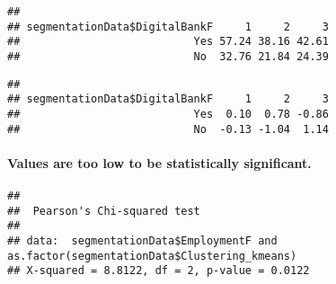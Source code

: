 \documentclass[
]{article}
\newenvironment{Shaded}{\begin{snugshade}}{\end{snugshade}}
\newcommand{\DecValTok}[1]{\textcolor[rgb]{0.00,0.00,0.81}{#1}}
\newcommand{\FunctionTok}[1]{\textcolor[rgb]{0.00,0.00,0.00}{#1}}
\newcommand{\NormalTok}[1]{#1}
\newcommand{\OtherTok}[1]{\textcolor[rgb]{0.56,0.35,0.01}{#1}}
\newcommand{\SpecialCharTok}[1]{\textcolor[rgb]{0.00,0.00,0.00}{#1}}
\begin{document}
\begin{Shaded}
\end{Shaded}

\begin{verbatim}
##                              
## segmentationData$DigitalBankF     1     2     3
##                           Yes 57.24 38.16 42.61
##                           No  32.76 21.84 24.39
\end{verbatim}

\begin{Shaded}
\end{Shaded}

\begin{verbatim}
##                              
## segmentationData$DigitalBankF     1     2     3
##                           Yes  0.10  0.78 -0.86
##                           No  -0.13 -1.04  1.14
\end{verbatim}

\hypertarget{values-are-too-low-to-be-statistically-significant.}{%
\paragraph{Values are too low to be statistically
significant.}\label{values-are-too-low-to-be-statistically-significant.}}

\begin{Shaded}
\end{Shaded}

\begin{verbatim}
## 
##  Pearson's Chi-squared test
## 
## data:  segmentationData$EmploymentF and as.factor(segmentationData$Clustering_kmeans)
## X-squared = 8.8122, df = 2, p-value = 0.0122
\end{verbatim}
\end{document}
